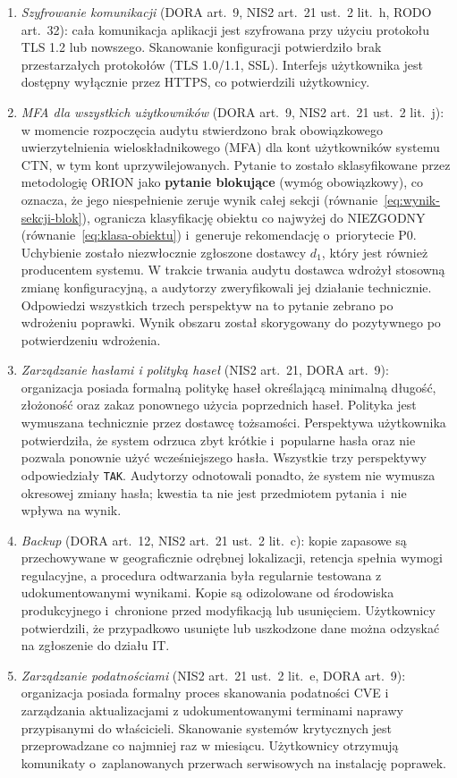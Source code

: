 \begin{enumerate}[label=(\roman*)]
  \item \textit{Szyfrowanie komunikacji} (DORA art.~9, NIS2 art.~21 ust.~2 lit.~h, RODO art.~32): cała komunikacja aplikacji jest szyfrowana przy użyciu protokołu TLS 1.2 lub nowszego. Skanowanie konfiguracji potwierdziło brak przestarzałych protokołów (TLS 1.0/1.1, SSL). Interfejs użytkownika jest dostępny wyłącznie przez HTTPS, co potwierdzili użytkownicy.

  \item \textit{MFA dla wszystkich użytkowników} (DORA art.~9, NIS2 art.~21 ust.~2 lit.~j): w momencie rozpoczęcia audytu stwierdzono brak obowiązkowego uwierzytelnienia wieloskładnikowego (MFA) dla kont użytkowników systemu CTN, w tym kont uprzywilejowanych. Pytanie to zostało sklasyfikowane przez metodologię ORION jako \textbf{pytanie blokujące} (wymóg obowiązkowy), co oznacza, że jego niespełnienie zeruje wynik całej sekcji (równanie~\eqref{eq:wynik-sekcji-blok}), ogranicza klasyfikację obiektu co najwyżej do \textsc{NIEZGODNY} (równanie~\eqref{eq:klasa-obiektu}) i~generuje rekomendację o~priorytecie P0. Uchybienie zostało niezwłocznie zgłoszone dostawcy $d_1$, który jest również producentem systemu. W trakcie trwania audytu dostawca wdrożył stosowną zmianę konfiguracyjną, a audytorzy zweryfikowali jej działanie technicznie. Odpowiedzi wszystkich trzech perspektyw na to pytanie zebrano po wdrożeniu poprawki. Wynik obszaru został skorygowany do pozytywnego po potwierdzeniu wdrożenia.

  \item \textit{Zarządzanie hasłami i polityką haseł} (NIS2 art.~21, DORA art.~9): organizacja posiada formalną politykę haseł określającą minimalną długość, złożoność oraz zakaz ponownego użycia poprzednich haseł. Polityka jest wymuszana technicznie przez dostawcę tożsamości. Perspektywa użytkownika potwierdziła, że system odrzuca zbyt krótkie i~popularne hasła oraz nie pozwala ponownie użyć wcześniejszego hasła. Wszystkie trzy perspektywy odpowiedziały \texttt{TAK}. Audytorzy odnotowali ponadto, że system nie wymusza okresowej zmiany hasła; kwestia ta nie jest przedmiotem pytania i~nie wpływa na wynik.

  \item \textit{Backup} (DORA art.~12, NIS2 art.~21 ust.~2 lit.~c): kopie zapasowe są przechowywane w geograficznie odrębnej lokalizacji, retencja spełnia wymogi regulacyjne, a procedura odtwarzania była regularnie testowana z udokumentowanymi wynikami. Kopie są odizolowane od środowiska produkcyjnego i~chronione przed modyfikacją lub usunięciem. Użytkownicy potwierdzili, że przypadkowo usunięte lub uszkodzone dane można odzyskać na zgłoszenie do działu IT.

  \item \textit{Zarządzanie podatnościami} (NIS2 art.~21 ust.~2 lit.~e, DORA art.~9): organizacja posiada formalny proces skanowania podatności CVE i zarządzania aktualizacjami z udokumentowanymi terminami naprawy przypisanymi do właścicieli. Skanowanie systemów krytycznych jest przeprowadzane co najmniej raz w miesiącu. Użytkownicy otrzymują komunikaty o~zaplanowanych przerwach serwisowych na instalację poprawek.
\end{enumerate}


